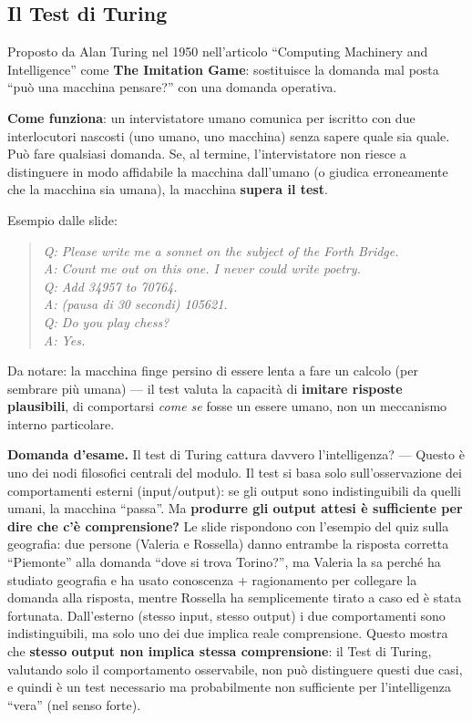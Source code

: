 \documentclass[11pt,a4paper]{report}
\newcommand{\domandaesame}[1]{\begin{esame}\textbf{Domanda d'esame.} #1\end{esame}}
\begin{document}
\subsection{Il Test di Turing}

Proposto da Alan Turing nel 1950 nell'articolo ``Computing Machinery and Intelligence'' come \textbf{The Imitation Game}: sostituisce la domanda mal posta ``può una macchina pensare?'' con una domanda operativa.

\textbf{Come funziona}: un intervistatore umano comunica per iscritto con due interlocutori nascosti (uno umano, uno macchina) senza sapere quale sia quale. Può fare qualsiasi domanda. Se, al termine, l'intervistatore non riesce a distinguere in modo affidabile la macchina dall'umano (o giudica erroneamente che la macchina sia umana), la macchina \textbf{supera il test}.

Esempio dalle slide:
\begin{quote}
\textit{Q: Please write me a sonnet on the subject of the Forth Bridge.}\\
\textit{A: Count me out on this one. I never could write poetry.}\\
\textit{Q: Add 34957 to 70764.}\\
\textit{A: (pausa di 30 secondi) 105621.}\\
\textit{Q: Do you play chess?}\\
\textit{A: Yes.}
\end{quote}
Da notare: la macchina finge persino di essere lenta a fare un calcolo (per sembrare più umana) --- il test valuta la capacità di \textbf{imitare risposte plausibili}, di comportarsi \emph{come se} fosse un essere umano, non un meccanismo interno particolare.

\domandaesame{Il test di Turing cattura davvero l'intelligenza? --- Questo è uno dei nodi filosofici centrali del modulo. Il test si basa solo sull'osservazione dei comportamenti esterni (input/output): se gli output sono indistinguibili da quelli umani, la macchina ``passa''. Ma \textbf{produrre gli output attesi è sufficiente per dire che c'è comprensione?} Le slide rispondono con l'esempio del quiz sulla geografia: due persone (Valeria e Rossella) danno entrambe la risposta corretta ``Piemonte'' alla domanda ``dove si trova Torino?'', ma Valeria la sa perché ha studiato geografia e ha usato conoscenza + ragionamento per collegare la domanda alla risposta, mentre Rossella ha semplicemente tirato a caso ed è stata fortunata. Dall'esterno (stesso input, stesso output) i due comportamenti sono indistinguibili, ma solo uno dei due implica reale comprensione. Questo mostra che \textbf{stesso output non implica stessa comprensione}: il Test di Turing, valutando solo il comportamento osservabile, non può distinguere questi due casi, e quindi è un test necessario ma probabilmente non sufficiente per l'intelligenza ``vera'' (nel senso forte).}
\end{document}
